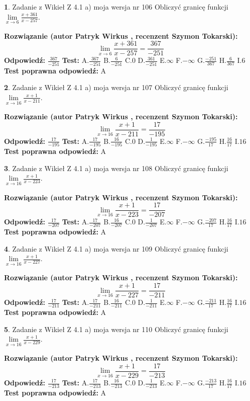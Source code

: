 \documentclass[12pt, a4paper]{article}
\theoremstyle{definition} %
\newtheorem{zad}{}
\newcommand{\zadStart}[1]{\begin{zad}#1\newline}
\newcommand{\zadStop}{\end{zad}}
\newcommand{\rozwStart}[2]{\noindent \textbf{Rozwiązanie (autor #1 , recenzent #2): }\newline}
\newcommand{\rozwStop}{\newline}
\newcommand{\odpStart}{\noindent \textbf{Odpowiedź:}\newline}
\newcommand{\odpStop}{\newline}
\newcommand{\testStart}{\noindent \textbf{Test:}\newline}
\newcommand{\testStop}{\newline}
\newcommand{\kluczStart}{\noindent \textbf{Test poprawna odpowiedź:}\newline}
\newcommand{\kluczStop}{\newline}
\begin{document}
\zadStart{Zadanie z Wikieł Z 4.1 a) moja wersja nr 106}
Obliczyć granicę funkcji $\lim\limits_{x\to6}\frac{x+361}{x-257}$.
\zadStop
\rozwStart{Patryk Wirkus}{Szymon Tokarski}
$$\lim\limits_{x\to6}\frac{x+361}{x-257} = \frac{367}{-251}$$
\rozwStop
\odpStart
$\frac{367}{-251}$
\odpStop
\testStart
A.$\frac{367}{-251}$
B.$\frac{6}{-251}$
C.$0$
D.$\frac{361}{-251}$
E.$\infty$
F.$-\infty$
G.$\frac{-251}{367}$
H.$\frac{6}{367}$
I.$6$
\testStop
\kluczStart
A
\kluczStop



\zadStart{Zadanie z Wikieł Z 4.1 a) moja wersja nr 107}
Obliczyć granicę funkcji $\lim\limits_{x\to16}\frac{x+1}{x-211}$.
\zadStop
\rozwStart{Patryk Wirkus}{Szymon Tokarski}
$$\lim\limits_{x\to16}\frac{x+1}{x-211} = \frac{17}{-195}$$
\rozwStop
\odpStart
$\frac{17}{-195}$
\odpStop
\testStart
A.$\frac{17}{-195}$
B.$\frac{16}{-195}$
C.$0$
D.$\frac{1}{-195}$
E.$\infty$
F.$-\infty$
G.$\frac{-195}{17}$
H.$\frac{16}{17}$
I.$16$
\testStop
\kluczStart
A
\kluczStop



\zadStart{Zadanie z Wikieł Z 4.1 a) moja wersja nr 108}
Obliczyć granicę funkcji $\lim\limits_{x\to16}\frac{x+1}{x-223}$.
\zadStop
\rozwStart{Patryk Wirkus}{Szymon Tokarski}
$$\lim\limits_{x\to16}\frac{x+1}{x-223} = \frac{17}{-207}$$
\rozwStop
\odpStart
$\frac{17}{-207}$
\odpStop
\testStart
A.$\frac{17}{-207}$
B.$\frac{16}{-207}$
C.$0$
D.$\frac{1}{-207}$
E.$\infty$
F.$-\infty$
G.$\frac{-207}{17}$
H.$\frac{16}{17}$
I.$16$
\testStop
\kluczStart
A
\kluczStop



\zadStart{Zadanie z Wikieł Z 4.1 a) moja wersja nr 109}
Obliczyć granicę funkcji $\lim\limits_{x\to16}\frac{x+1}{x-227}$.
\zadStop
\rozwStart{Patryk Wirkus}{Szymon Tokarski}
$$\lim\limits_{x\to16}\frac{x+1}{x-227} = \frac{17}{-211}$$
\rozwStop
\odpStart
$\frac{17}{-211}$
\odpStop
\testStart
A.$\frac{17}{-211}$
B.$\frac{16}{-211}$
C.$0$
D.$\frac{1}{-211}$
E.$\infty$
F.$-\infty$
G.$\frac{-211}{17}$
H.$\frac{16}{17}$
I.$16$
\testStop
\kluczStart
A
\kluczStop



\zadStart{Zadanie z Wikieł Z 4.1 a) moja wersja nr 110}
Obliczyć granicę funkcji $\lim\limits_{x\to16}\frac{x+1}{x-229}$.
\zadStop
\rozwStart{Patryk Wirkus}{Szymon Tokarski}
$$\lim\limits_{x\to16}\frac{x+1}{x-229} = \frac{17}{-213}$$
\rozwStop
\odpStart
$\frac{17}{-213}$
\odpStop
\testStart
A.$\frac{17}{-213}$
B.$\frac{16}{-213}$
C.$0$
D.$\frac{1}{-213}$
E.$\infty$
F.$-\infty$
G.$\frac{-213}{17}$
H.$\frac{16}{17}$
I.$16$
\testStop
\kluczStart
A
\kluczStop
\end{document}
